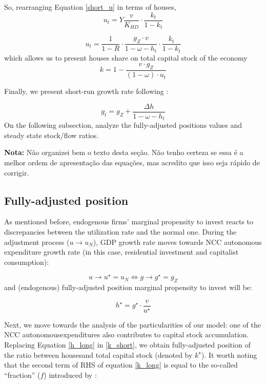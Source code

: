 \documentclass[11pt]{article}
\begin{document}
So, rearranging Equation \ref{short_u} in terms of houses,
$$
u_{t} = Y\frac{v}{K_{HD}}\cdot \frac{k_{t}}{1-k_{t}}
$$

\begin{equation}
\label{u_houses}
u_{t} = \frac{1}{1-R}\cdot \frac{g_Z\cdot v}{1 - \omega - h_{t}}\cdot \frac{k_{t}}{1-k_{t}}
\end{equation}
which allows us to present houses share on total capital stock of the economy
\begin{equation}
\label{k_short}
k = 1 - \frac{v\cdot g_Z}{(1 - \omega)\cdot u_{t}}
\end{equation}


Finally, we present short-run growth rate following \textcite{freitas_growth_2015}:

\begin{equation}
\label{g_short}
g_t = g_{Z} + \frac{\Delta h}{1 - \omega - h_{t}}
\end{equation}
On the following subsection, analyze the fully-adjusted positions values and steady state stock/flow ratios.


\textbf{Nota:} Não organizei bem o texto desta seção. Não tenho certeza se essa é a melhor ordem de apresentação das equações, mas acredito que isso seja rápido de corrigir.

\subsection{Fully-adjusted position}
\label{sec:orgba7ef48}
\label{long}


As mentioned before, endogenous firms’ marginal propensity to invest reacts to discrepancies between the utilization rate and the normal one.  During the adjustment process (\(u\to u_N\)), GDP growth rate moves towards NCC autonomous expenditure growth rate (in this case, residential investment and capitalist consumption):

$$
u \to u^{\star}  = u_N \Leftrightarrow g \to g^{\star} = g_Z
$$
and (endogenous) fully-adjusted position marginal propensity to invest will be:


\begin{equation}
\label{h_long}
h^{\star} = g^{\star}\cdot \frac{v}{u^{\star}}
\end{equation}

Next, we move towards the analysis of the particularities of our model:  one of the NCC autonomousexpenditures also contributes to capital stock accumulation.  
Replacing Equation \ref{h_long} in \ref{k_short}, we obtain fully-adjusted position of the ratio between housesand total capital stock (denoted by \(k^\star\)). It worth noting that the second term of RHS of equation \ref{k_long} is equal to the so-called ``fraction'' (\(f\)) introduced by \textcite{serrano_long_1995}:
\end{document}
